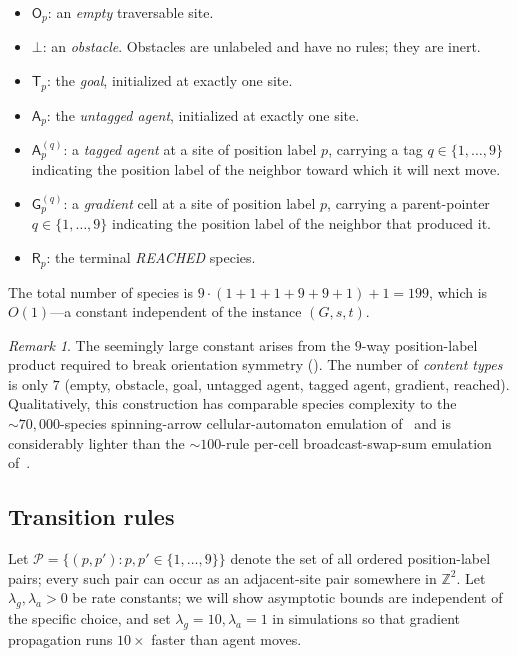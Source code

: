 \documentclass[11pt]{article}
\theoremstyle{plain}
\theoremstyle{definition}
\theoremstyle{remark}
\newtheorem{remark}[theorem]{Remark}
\newcommand{\Z}{\mathbb{Z}}
\begin{document}
\begin{itemize}
    \item $\mathsf{O}_p$: an \emph{empty} traversable site.
    \item $\bot$: an \emph{obstacle}. Obstacles are unlabeled and have no rules; they are inert.
    \item $\mathsf{T}_p$: the \emph{goal}, initialized at exactly one site.
    \item $\mathsf{A}_p$: the \emph{untagged agent}, initialized at exactly one site.
    \item $\mathsf{A}^{(q)}_p$: a \emph{tagged agent} at a site of position label $p$, carrying a tag $q \in \{1, \ldots, 9\}$ indicating the position label of the neighbor toward which it will next move.
    \item $\mathsf{G}^{(q)}_p$: a \emph{gradient} cell at a site of position label $p$, carrying a parent-pointer $q \in \{1, \ldots, 9\}$ indicating the position label of the neighbor that produced it.
    \item $\mathsf{R}_p$: the terminal \emph{REACHED} species.
\end{itemize}

The total number of species is $9 \cdot (1 + 1 + 1 + 9 + 9 + 1) + 1 = 199$, which is $O(1)$---a constant independent of the instance $(G, s, t)$.

\begin{remark}
The seemingly large constant arises from the $9$-way position-label product required to break orientation symmetry (). The number of \emph{content types} is only $7$ (empty, obstacle, goal, untagged agent, tagged agent, gradient, reached). Qualitatively, this construction has comparable species complexity to the $\sim 70{,}000$-species spinning-arrow cellular-automaton emulation of~\cite[\S 3.2]{clamons2020} and is considerably lighter than the $\sim 100$-rule per-cell broadcast-swap-sum emulation of~\cite[\S 3.3]{clamons2020}.
\end{remark}

\subsection{Transition rules}
\label{subsec:rules}

Let $\mathcal{P} = \{(p, p') : p, p' \in \{1,\ldots,9\}\}$ denote the set of all ordered position-label pairs; every such pair can occur as an adjacent-site pair somewhere in $\Z^2$. Let $\lambda_g, \lambda_a > 0$ be rate constants; we will show asymptotic bounds are independent of the specific choice, and set $\lambda_g = 10, \lambda_a = 1$ in simulations so that gradient propagation runs $10\times$ faster than agent moves.
\end{document}
